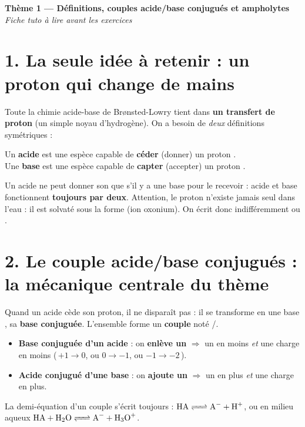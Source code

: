 \documentclass[11pt,a4paper]{article}
\begin{document}
\begin{center}
{\LARGE\bfseries\color{primarydark} Thème 1 --- Définitions, couples acide/base conjugués et ampholytes}\\[3pt]
{\color{primary}\itshape Fiche tuto à lire avant les exercices}
\end{center}

\section*{1. La seule idée à retenir : un proton  qui change de mains}

Toute la chimie acide-base de Brønsted-Lowry tient dans \textbf{un transfert de proton } (un simple
noyau d'hydrogène). On a besoin de \emph{deux} définitions symétriques :

\begin{definition}
Un \textbf{acide} est une espèce capable de \textbf{céder} (donner) un proton .\\
Une \textbf{base} est une espèce capable de \textbf{capter} (accepter) un proton .
\end{definition}

Un acide ne peut donner son  que s'il y a une base pour le recevoir : acide et base fonctionnent
\textbf{toujours par deux}. Attention, le proton  n'existe jamais seul dans l'eau : il est solvaté sous
la forme  (ion oxonium). On écrit donc indifféremment  ou .

\section*{2. Le couple acide/base conjugués : la mécanique centrale du thème}

Quand un acide  cède son proton, il ne disparaît pas : il se transforme en une base , sa
\textbf{base conjuguée}. L'ensemble forme un \textbf{couple} noté /.

\begin{regle}
\begin{itemize}[leftmargin=1.5em,topsep=1pt,itemsep=1pt]
  \item \textbf{Base conjuguée d'un acide} : on \textbf{enlève un } $\Rightarrow$ un  en moins
        \emph{et} une charge en moins (\,$+1 \to 0$, ou $0 \to -1$, ou $-1 \to -2$\,).
  \item \textbf{Acide conjugué d'une base} : on \textbf{ajoute un } $\Rightarrow$ un  en plus
        \emph{et} une charge en plus.
\end{itemize}
La demi-équation d'un couple s'écrit toujours : $\ce{HA <=> A- + H+}$, ou en milieu aqueux
$\ce{HA + H2O <=> A- + H3O+}$.
\end{regle}
\end{document}
